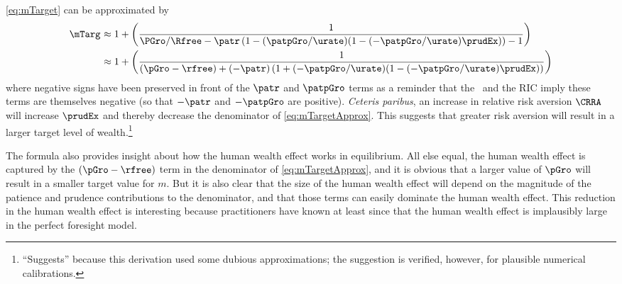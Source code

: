 \documentclass{handout}
\begin{document}
\eqref{eq:mTarget} can be approximated by
\begin{equation}\begin{gathered}\begin{aligned}
 \mTarg^{\null} & \approx  1 + \left(\frac{1}{\PGro/\Rfree-\patr \left(1-(\patpGro/\urate)(1-(-\patpGro/\urate)\prudEx) \right)-1}\right)
\\ & \approx  1 + \left(\frac{1}{(\pGro-\rfree)+(-\patr) \left(1+(-\patpGro/\urate)(1-(-\patpGro/\urate)\prudEx)\right)}\right)
\label{eq:mTargetApprox}
\end{aligned}\end{gathered}\end{equation}
where negative signs have been preserved in front of the $\patr$ and $\patpGro$ terms as a reminder that
the \GICPGro~and the RIC imply these terms are themselves negative (so that $-\patr$ and $-\patpGro$ are positive).
{\it Ceteris paribus}, an increase in relative risk aversion $\CRRA$ will increase $\prudEx$ and thereby decrease the denominator of \eqref{eq:mTargetApprox}.  This suggests that
greater risk aversion will result in a larger target level of wealth.\footnote{``Suggests'' because
this derivation used some dubious approximations; the suggestion is verified, however, for
plausible numerical calibrations.}


The formula also provides insight about how the human wealth effect
works in equilibrium.  All else equal, the human wealth effect is captured
by the $(\pGro-\rfree)$ term in the denominator of \eqref{eq:mTargetApprox},
and it is obvious that a larger value of $\pGro$ will result in a smaller
target value for $m$.  But it is also clear that the size of the human wealth
effect will depend on the magnitude of the patience and prudence contributions
to the denominator, and that those terms can easily dominate the human wealth
effect.  This reduction in the human wealth effect is interesting because practitioners have known at least since
\cite{summersCapTax} that the human wealth effect is implausibly large in the
perfect foresight model.
\end{document}
